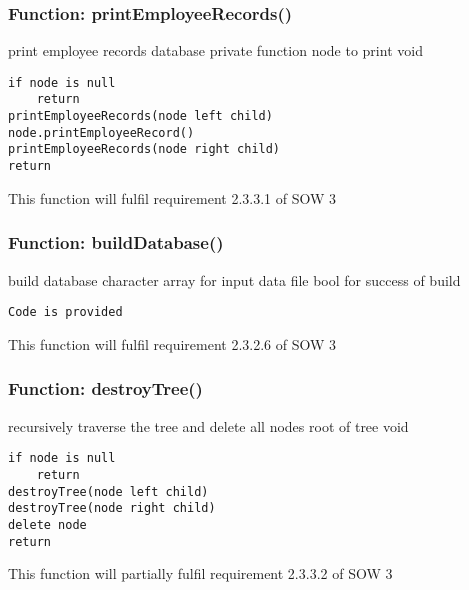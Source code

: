 \documentclass[12pt]{article}%
\newcounter{subsubsubsection}[subsubsection]
\begin{document}
\subsubsection{Function: printEmployeeRecords()}
print employee records database private function
node to print
void
\begin{verbatim}
if node is null
    return
printEmployeeRecords(node left child)
node.printEmployeeRecord()
printEmployeeRecords(node right child)
return
\end{verbatim}
This function will fulfil requirement 2.3.3.1 of SOW 3

\subsubsection{Function: buildDatabase()}
build database
character array for input data file
bool for success of build
\begin{verbatim}
Code is provided
\end{verbatim}
This function will fulfil requirement 2.3.2.6 of SOW 3

\subsubsection{Function: destroyTree()}
recursively traverse the tree and delete all nodes
root of tree
void
\begin{verbatim}
if node is null
    return
destroyTree(node left child)
destroyTree(node right child)
delete node
return
\end{verbatim}
This function will partially fulfil requirement 2.3.3.2 of SOW 3
\end{document}
